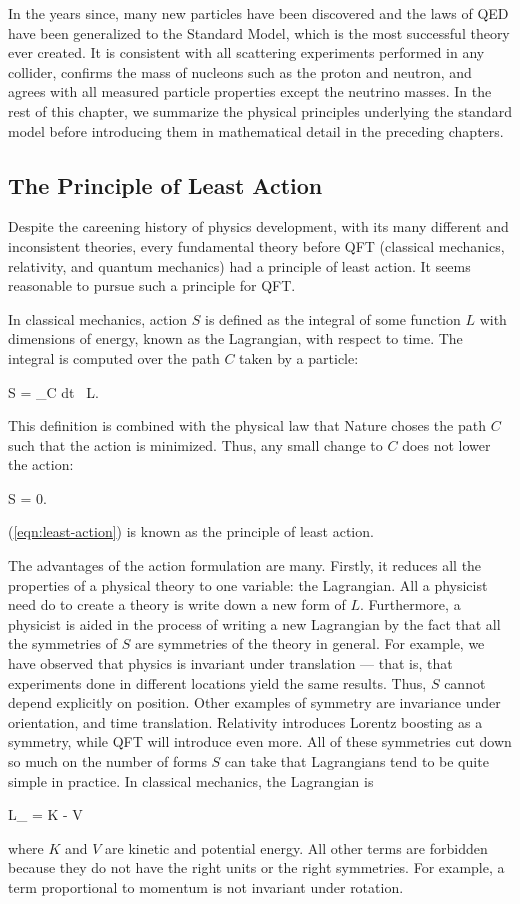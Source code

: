 In the years since, many new particles have been discovered and the laws of QED have been generalized to the Standard Model, which is the most successful theory ever created. It is consistent with all scattering experiments performed in any collider, confirms the mass of nucleons such as the proton and neutron, and agrees with all measured particle properties except the neutrino masses. In the rest of this chapter, we summarize the physical principles underlying the standard model before introducing them in mathematical detail in the preceding chapters.

\subsection{The Principle of Least Action}

Despite the careening history of physics development, with its many different and inconsistent theories, every fundamental theory before QFT (classical mechanics, relativity, and quantum mechanics) had a principle of least action. It seems reasonable to pursue such a principle for QFT.

In classical mechanics, action $S$ is defined as the integral of some function $L$ with dimensions of energy, known as the Lagrangian, with respect to time. The integral is computed over the path $C$ taken by a particle:
\begin{e}
  S = \int_C dt \, L.
\end{e}
This definition is combined with the physical law that Nature choses the path $C$ such that the action is minimized. Thus, any small change to $C$ does not lower the action:
\begin{e}
  \delta S = 0.
  \label{eqn:least-action}
\end{e}
(\ref{eqn:least-action}) is known as the principle of least action.

The advantages of the action formulation are many. Firstly, it reduces all the properties of a physical theory to one variable: the Lagrangian. All a physicist need do to create a theory is write down a new form of $L$. Furthermore, a physicist is aided in the process of writing a new Lagrangian by the fact that all the symmetries of $S$ are symmetries of the theory in general. For example, we have observed that physics is invariant under translation --- that is, that experiments done in different locations yield the same results. Thus, $S$ cannot depend explicitly on position. Other examples of symmetry are invariance under orientation, and time translation. Relativity introduces Lorentz boosting as a symmetry, while QFT will introduce even more. All of these symmetries cut down so much on the number of forms $S$ can take that Lagrangians tend to be quite simple in practice. In classical mechanics, the Lagrangian is
\begin{e}
  L_ = K - V
  \label{eqn:classical-lagrangian}
\end{e}
where $K$ and $V$ are kinetic and potential energy. All other terms are forbidden because they do not have the right units or the right symmetries. For example, a term proportional to momentum is not invariant under rotation.

